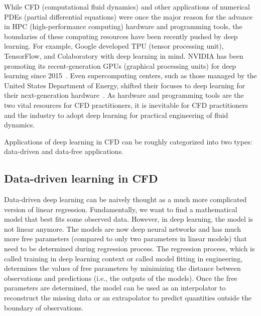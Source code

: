 
While CFD (computational fluid dynamics) and other applications of numerical PDEs (partial differential equations) were once the major reason for the advance in HPC (high-performance computing) hardware and programming tools, the boundaries of these computing resources have been recently pushed by deep learning.
For example, Google developed TPU (tensor processing unit), TensorFlow, and Colaboratory with deep learning in mind.
NVIDIA has been promoting its recent-generation GPUs (graphical processing units) for deep learning since 2015~\cite{buck_nvidias_2015}.
Even supercomputing centers, such as those managed by the United States Department of Energy, shifted their focuses to deep learning for their next-generation hardware~\cite{us_department_of_energy_argonne_2019}.
As hardware and programming tools are the two vital resources for CFD practitioners, it is inevitable for CFD practitioners and the industry to adopt deep learning for practical engineering of fluid dynamics.

Applications of deep learning in CFD can be roughly categorized into two types: data-driven and data-free applications.

\subsection*{Data-driven learning in CFD}

Data-driven deep learning can be naively thought as a much more complicated version of linear regression.
Fundamentally, we want to find a mathematical model that best fits some observed data.
However, in deep learning, the model is not linear anymore.
The models are now deep neural networks and has much more free parameters (compared to only two parameters in linear models) that need to be determined during regression process.
The regression process, which is called training in deep learning context or called model fitting in engineering, determines the values of free parameters by minimizing the distance between observations and predictions (i.e., the outputs of the models).
Once the free parameters are determined, the model can be used as an interpolator to reconstruct the missing data or an extrapolator to predict quantities outside the boundary of observations.

